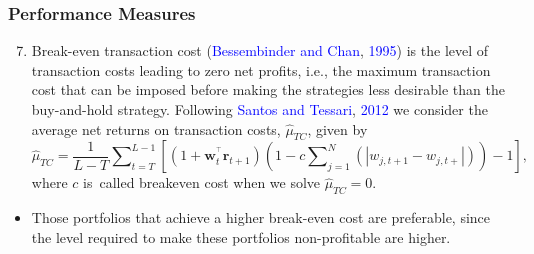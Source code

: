 \documentclass[pdf,10pt,xcolor=dvipsnames,hide notes]{beamer}
\begin{document}
\begin{frame}
	\frametitle{Performance Measures}
	
	\begin{enumerate}
		\setcounter{enumi}{6}
		
		\item Break-even transaction cost (\textcolor{blue}{Bessembinder and Chan}, \textcolor{blue}{1995}) is the level of transaction costs leading to zero
		net profits, i.e., the maximum transaction cost that can be imposed before
		making the strategies less desirable than the buy-and-hold strategy. Following \textcolor{blue}{Santos and Tessari}, \textcolor{blue}{2012} we consider the average net
		returns on transaction costs, $\widehat{\mu }_{TC}$, given by
		\begin{equation}
		\widehat{\mu }_{TC}=\frac{1}{L-T}\sum\nolimits_{t=T}^{L-1}\left[ \left( 1+%
		\mathbf{w}_{t}^{^{\top }}\mathbf{r}_{t+1}\right) \left(
		1-c\sum\nolimits_{j=1}^{N}\left( \left\vert w_{j,t+1}-w_{j,t+}\right\vert
		\right) \right) -1\right] ,
		\end{equation}%
		where $c$ is\ called breakeven cost when we solve $\widehat{\mu }_{TC}=0.$
		
		
	\end{enumerate}

\vspace{0.3cm}

\begin{itemize}
	\item 	Those portfolios that achieve a
	higher break-even cost are preferable, since the level required to make
	these portfolios non-profitable are higher.
\end{itemize}
	
	
\end{frame}
\end{document}
